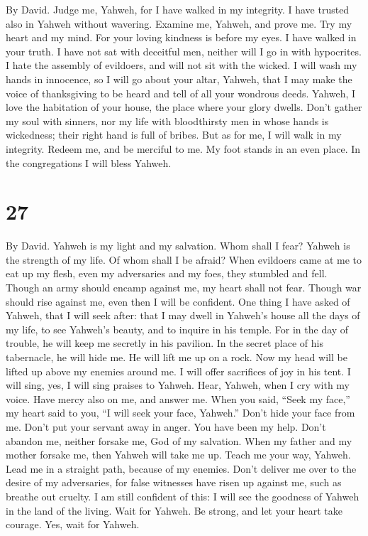 By David.  Judge me, Yahweh, for I have walked in my
integrity. I have trusted also in Yahweh without wavering.
 Examine me, Yahweh, and prove me. Try my heart and my
mind.  For your loving kindness is before my eyes. I have
walked in your truth.  I have not sat with deceitful men,
neither will I go in with hypocrites.  I hate the assembly
of evildoers, and will not sit with the wicked.  I will
wash my hands in innocence, so I will go about your altar, Yahweh,
 that I may make the voice of thanksgiving to be heard and
tell of all your wondrous deeds.  Yahweh, I love the
habitation of your house, the place where your glory dwells.
 Don't gather my soul with sinners, nor my life with
bloodthirsty men  in whose hands is wickedness; their
right hand is full of bribes.  But as for me, I will walk
in my integrity. Redeem me, and be merciful to me.  My
foot stands in an even place. In the congregations I will bless Yahweh.

\hypertarget{section-26}{%
\section{27}\label{section-26}}

By David.  Yahweh is my light and my salvation. Whom shall
I fear? Yahweh is the strength of my life. Of whom shall I be afraid?
 When evildoers came at me to eat up my flesh, even my
adversaries and my foes, they stumbled and fell.  Though
an army should encamp against me, my heart shall not fear. Though war
should rise against me, even then I will be confident. 
One thing I have asked of Yahweh, that I will seek after: that I may
dwell in Yahweh's house all the days of my life, to see Yahweh's beauty,
and to inquire in his temple.  For in the day of trouble,
he will keep me secretly in his pavilion. In the secret place of his
tabernacle, he will hide me. He will lift me up on a rock.
 Now my head will be lifted up above my enemies around me.
I will offer sacrifices of joy in his tent. I will sing, yes, I will
sing praises to Yahweh.  Hear, Yahweh, when I cry with my
voice. Have mercy also on me, and answer me.  When you
said, ``Seek my face,'' my heart said to you, ``I will seek your face,
Yahweh.''  Don't hide your face from me. Don't put your
servant away in anger. You have been my help. Don't abandon me, neither
forsake me, God of my salvation.  When my father and my
mother forsake me, then Yahweh will take me up.  Teach me
your way, Yahweh. Lead me in a straight path, because of my enemies.
 Don't deliver me over to the desire of my adversaries,
for false witnesses have risen up against me, such as breathe out
cruelty.  I am still confident of this: I will see the
goodness of Yahweh in the land of the living.  Wait for
Yahweh. Be strong, and let your heart take courage. Yes, wait for
Yahweh.

